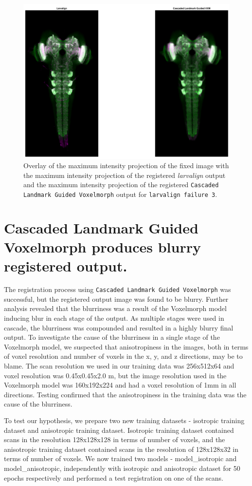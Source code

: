 \documentclass{book}
\begin{document}
	\begin{figure}[h!]
		\centering
		\includegraphics[width=0.7\columnwidth]{resources/Chapter7/LRE_Visual/60a07.png}
		\caption{Overlay of the maximum intensity projection of the fixed image with the maximum intensity projection of the registered \textit{larvalign} output and the maximum intensity projection of the registered \texttt{Cascaded Landmark Guided Voxelmorph} output for \texttt{larvalign failure 3}.}
		\label{fig:larvalign failure 3}
	\end{figure}
	
	\section{Cascaded Landmark Guided Voxelmorph produces blurry registered output.}
	The registration process using \texttt{Cascaded Landmark Guided Voxelmorph} was successful, but the registered output image was found to be blurry. Further analysis revealed that the blurriness was a result of the Voxelmorph model inducing blur in each stage of the output. As multiple stages were used in cascade, the blurriness was compounded and resulted in a highly blurry final output. To investigate the cause of the blurriness in a single stage of the Voxelmorph model, we suspected that anisotropiness in the images, both in terms of voxel resolution and number of voxels in the x, y, and z directions, may be to blame. The scan resolution we used in our training data was 256x512x64 and voxel resolution was 0.45x0.45x2.0 \textmu m, but the image resolution used in the Voxelmorph model was 160x192x224 and had a voxel resolution of 1mm in all directions. Testing confirmed that the anisotropiness in the training data was the cause of the blurriness.
	
	To test our hypothesis, we prepare two new training datasets - isotropic training dataset and anisotropic training dataset. Isotropic training dataset contained scans in the resolution 128x128x128 in terms of number of voxels, and the anisotropic training dataset contained scans in the resolution of 128x128x32 in terms of number of voxels. We now trained two models - model\_isotropic and model\_anisotropic, independently with isotropic and anisotropic dataset for 50 epochs respectively and performed a test registration on one of the scans.
	
\end{document}
